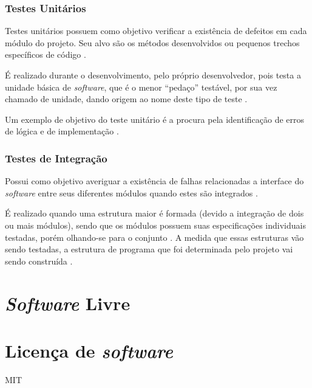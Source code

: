         \subsubsection{Testes Unitários}
        Testes unitários possuem como objetivo verificar a existência de defeitos em cada módulo do projeto. Seu alvo são os métodos desenvolvidos ou pequenos trechos específicos de código \cite{artigo_intro_teste}.

        É realizado durante o desenvolvimento, pelo próprio desenvolvedor, pois testa a unidade básica de \textit{software}, que é o menor ``pedaço''  testável, por sua vez chamado de unidade, dando origem ao nome deste tipo de teste \cite{sw_test_tech}.

        Um exemplo de objetivo do teste unitário é a procura pela identificação de erros de lógica e de implementação \cite{maldonado}.

        \subsubsection{Testes de Integração}
        Possui como objetivo averiguar a existência de falhas relacionadas a interface do \textit{software} entre seus diferentes módulos quando estes são integrados \cite{artigo_intro_teste}.

        É realizado quando uma estrutura maior é formada (devido a integração de dois ou mais módulos), sendo que os módulos possuem suas especificações individuais testadas, porém olhando-se para o conjunto \cite{sw_test_tech}. A medida que essas estruturas vão sendo testadas, a estrutura de programa que foi determinada pelo projeto vai sendo construída \cite{maldonado}.

\section{\textit{Software} Livre}

\section{Licença de \textit{software}}
MIT